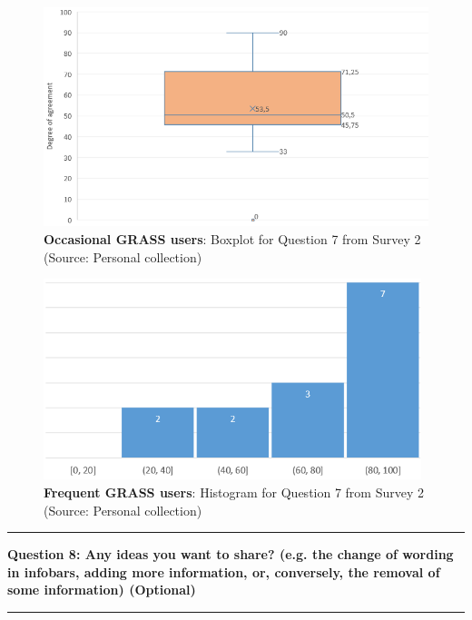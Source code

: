 \documentclass[a4paper,10pt,twoside]{article}
\begin{document}
\newpage
\begin{figure}[hbt!] 
\begin{center}
\includegraphics[width=12cm]{../surveys/analyzed_data/survey2_question7_boxplot_group1.png} 
\caption[\textbf{Occasional GRASS users}: Boxplot for Question 7 from Survey 2]{\textbf{Occasional GRASS users}: Boxplot for Question 7 from Survey 2 (Source: Personal collection)}
\label{fig:survey2_question7_boxplot_group1}
\end{center}
\end{figure}

\vspace{0.3cm}
\begin{figure}[hbt!] 
\begin{center}
\includegraphics[width=11cm]{../surveys/analyzed_data/survey2_question7_histogram_group2.png} 
\caption[\textbf{Frequent GRASS users}: Histogram for Question 7 from Survey 2]{\textbf{Frequent GRASS users}: Histogram for Question 7 from Survey 2 (Source: Personal collection)}
\label{fig:survey2_question7_histogram_group2}
\end{center}
\end{figure}

\par\noindent\rule{\textwidth}{0.4pt}
\noindent \textbf{Question 8: Any ideas you want to share? (e.g. the change of wording in infobars, adding more information, or, conversely, the removal of some information) (Optional)}
\par\noindent\rule{\textwidth}{0.4pt}
\end{document}
